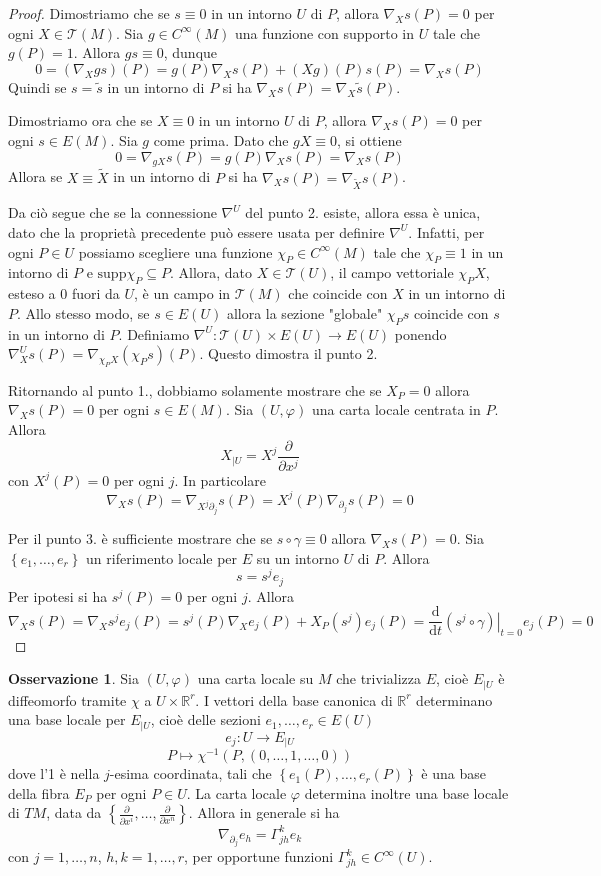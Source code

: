 \documentclass[a4paper,11pt]{article}
\theoremstyle{definition}
\newtheorem{osservazione}{Osservazione}[section]
\theoremstyle{theorem}
\newcommand{\dif}{\mathrm{d}}
\newcommand{\R}{\mathbb{R}}
\newcommand{\T}{\mathcal{T}}
\begin{document}
\begin{proof}
	Dimostriamo che se $s\equiv0$ in un intorno $U$ di $P$, allora $\nabla_Xs(P)=0$ per ogni $X\in\T(M)$. Sia $g\in C^\infty(M)$ una funzione con supporto in $U$ tale che $g(P)=1$. Allora $gs\equiv0$, dunque
	\[0=\left(\nabla_Xgs\right)(P)=g(P)\nabla_Xs(P)+(Xg)(P)s(P)=\nabla_Xs(P)\]
	Quindi se $s=\tilde{s}$ in un intorno di $P$ si ha $\nabla_Xs(P)=\nabla_X\tilde{s}(P)$.
	
	Dimostriamo ora che se $X\equiv0$ in un intorno $U$ di $P$, allora $\nabla_Xs(P)=0$ per ogni $s\in E(M)$. Sia $g$ come prima. Dato che $gX\equiv0$, si ottiene
	\[0=\nabla_{gX}s(P)=g(P)\nabla_Xs(P)=\nabla_Xs(P)\]
	Allora se $X\equiv\tilde{X}$ in un intorno di $P$ si ha $\nabla_Xs(P)=\nabla_{\tilde{X}}s(P)$.
	
	Da ciò segue che se la connessione $\nabla^U$ del punto 2. esiste, allora essa è unica, dato che la proprietà precedente può essere usata per definire $\nabla^U$. Infatti, per ogni $P\in U$ possiamo scegliere una funzione $\chi_P\in C^\infty(M)$ tale che $\chi_P\equiv1$ in un intorno di $P$ e $\textrm{supp}\chi_P\subseteq P$. Allora, dato $X\in\T(U)$, il campo vettoriale $\chi_PX$, esteso a 0 fuori da $U$, è un campo in $\T(M)$ che coincide con $X$ in un intorno di $P$. Allo stesso modo, se $s\in E(U)$ allora la sezione "globale" $\chi_Ps$ coincide con $s$ in un intorno di $P$. Definiamo $\nabla^U\colon\T(U)\times E(U)\to E(U)$ ponendo $\nabla_X^Us(P)=\nabla_{\chi_PX}(\chi_Ps)(P)$. Questo dimostra il punto 2.
	
	Ritornando al punto 1., dobbiamo solamente mostrare che se $X_P=0$ allora $\nabla_Xs(P)=0$ per ogni $s\in E(M)$. Sia $(U,\varphi)$ una carta locale centrata in $P$. Allora
	\[X_{|U}=X^j\frac{\partial}{\partial x^j}\]
	con $X^j(P)=0$ per ogni $j$. In particolare
	\[\nabla_Xs(P)=\nabla_{X^j\partial_j}s(P)=X^j(P)\nabla_{\partial_j}s(P)=0\]
	
	Per il punto 3. è sufficiente mostrare che se $s\circ\gamma\equiv0$ allora $\nabla_Xs(P)=0$. Sia $\left\{e_1,\dots,e_r\right\}$ un riferimento locale per $E$ su un intorno $U$ di $P$. Allora
	\[s=s^je_j\]
	Per ipotesi si ha $s^j(P)=0$ per ogni $j$. Allora
	\[\nabla_Xs(P)=\nabla_Xs^je_j(P)=s^j(P)\nabla_Xe_j(P)+X_P(s^j)e_j(P)=\frac{\dif}{\dif t}\left.\left(s^j\circ\gamma\right)\right|_{t=0}e_j(P)=0\]
\end{proof}
\begin{osservazione}
	Sia $(U,\varphi)$ una carta locale su $M$ che trivializza $E$, cioè $E_{|U}$ è diffeomorfo tramite $\chi$ a $U\times\R^r$. I vettori della base canonica di $\R^r$ determinano una base locale per $E_{|U}$, cioè delle sezioni $e_1,\dots,e_r\in E(U)$
	\[e_j\colon U\to E_{|U}\]
	\[P\mapsto\chi^{-1}(P,(0,\dots,1,\dots,0))\]
	dove l'1 è nella $j$-esima coordinata, tali che $\left\{e_1(P),\dots,e_r(P)\right\}$ è una base della fibra $E_P$ per ogni $P\in U$. La carta locale $\varphi$ determina inoltre una base locale di $TM$, data da $\left\{\frac{\partial}{\partial x^i},\dots,\frac{\partial}{\partial x^n}\right\}$. Allora in generale si ha
	\[\nabla_{\partial_j}e_h=\Gamma^k_{jh}e_k\]
	con $j=1,\dots,n$, $h,k=1,\dots,r$, per opportune funzioni $\Gamma^k_{jh}\in C^\infty(U)$.
\end{osservazione}
\end{document}

